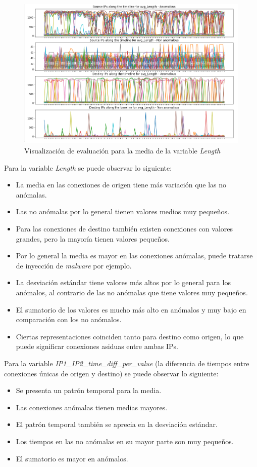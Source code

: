 \begin{figure}[h]
    \centering
    \includegraphics[width=17cm]{figs/evalutaion_example.PNG}
    \caption{Visualización de evaluación para la media de la variable \textit{Length}}
    \label{fig:eval_example}
\end{figure}

Para la variable \textit{Length} se puede observar lo siguiente:
\begin{itemize}
    \item La media en las conexiones de origen  tiene más variación que las no anómalas.
    \item Las no anómalas por lo general tienen valores medios muy pequeños.
    \item Para las conexiones de destino también existen conexiones con valores grandes, pero la mayoría tienen valores pequeños.
    \item Por lo general la media es mayor en las conexiones anómalas, puede tratarse de inyección de \textit{malware} por ejemplo.
    \item La desviación estándar tiene valores más altos por lo general para los anómalos, al contrario de las no anómalas que tiene valores muy pequeños.
    \item El sumatorio de los valores es mucho más alto en anómalos y muy bajo en comparación con los no anómalos.
    \item Ciertas representaciones coinciden tanto para destino como origen, lo que puede significar conexiones asiduas entre ambas IPs.
\end{itemize}

Para la variable \textit{IP1\_IP2\_time\_diff\_per\_value} (la diferencia de tiempos entre conexiones únicas de origen y destino) se puede observar lo siguiente:
\begin{itemize}
    \item Se presenta un patrón temporal para la media.
    \item Las conexiones anómalas tienen medias mayores.
    \item El patrón temporal también se aprecia en la desviación estándar.
    \item Los tiempos en las no anómalas en su mayor parte son muy pequeños.
    \item El sumatorio es mayor en anómalos.
\end{itemize}

